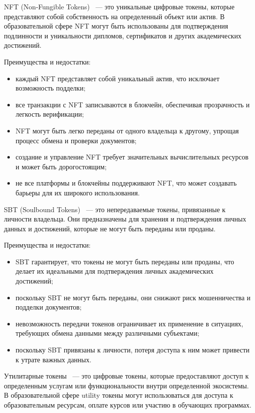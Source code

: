 NFT (Non-Fungible Tokens)~\cite{bib:what_is_nft} --- это уникальные цифровые токены, которые представляют собой собственность на определенный объект или актив. В образовательной сфере NFT могут быть использованы для подтверждения подлинности и уникальности дипломов, сертификатов и других академических достижений.

Преимущества и недостатки:
\begin{itemize}
    \item каждый NFT представляет собой уникальный актив, что исключает возможность подделки;
    \item все транзакции с NFT записываются в блокчейн, обеспечивая прозрачность и легкость верификации;
    \item NFT могут быть легко переданы от одного владельца к другому, упрощая процесс обмена и проверки документов;
    \item создание и управление NFT требует значительных вычислительных ресурсов и может быть дорогостоящим;
    \item не все платформы и блокчейны поддерживают NFT, что может создавать барьеры для их широкого использования.
\end{itemize}

SBT (Soulbound Tokens)~\cite{bib:what_is_sbt} --- это непередаваемые токены, привязанные к личности владельца. Они предназначены для хранения и подтверждения личных данных и достижений, которые не могут быть переданы или проданы.

Преимущества и недостатки:
\begin{itemize}
    \item SBT гарантирует, что токены не могут быть переданы или проданы, что делает их идеальными для подтверждения личных академических достижений;
    \item поскольку SBT не могут быть переданы, они снижают риск мошенничества и подделки документов;
    \item невозможность передачи токенов ограничивает их применение в ситуациях, требующих обмена данными между различными субъектами;
    \item поскольку SBT привязаны к личности, потеря доступа к ним может привести к утрате важных данных.
\end{itemize}

Утилитарные токены~\cite{bib:what_is_utt} --- это цифровые токены, которые предоставляют доступ к определенным услугам или функциональности внутри определенной экосистемы. В образовательной сфере utility токены могут использоваться для доступа к образовательным ресурсам, оплате курсов или участию в обучающих программах.


